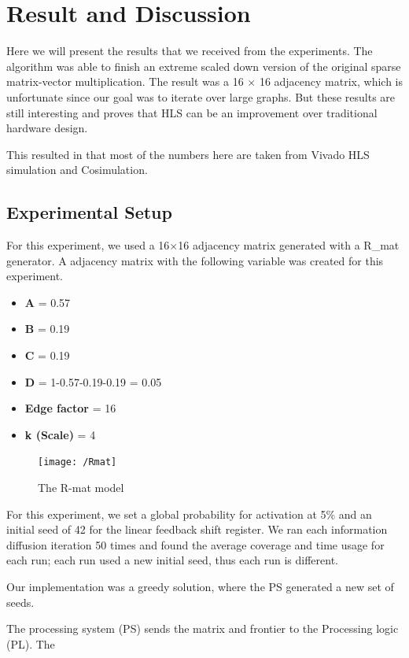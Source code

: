 \chapter{Result and Discussion} \label{result}
Here we will present the results that we received from the experiments. The algorithm was able to finish an extreme scaled down version of the original sparse matrix-vector multiplication. The result was a 16 $\times$ 16 adjacency matrix, which is unfortunate since our goal was to iterate over large graphs. But these results are still interesting and proves that HLS can be an improvement over traditional hardware design.


This resulted in that most of the numbers here are taken from Vivado HLS simulation and Cosimulation. 

\section{Experimental Setup}
For this experiment, we used a 16$\times$16 adjacency matrix generated with a R\_mat generator. A adjacency matrix with the following variable was created for this experiment.
\begin{itemize}
\item \textbf{A} = 0.57
\item \textbf{B} = 0.19
\item \textbf{C} = 0.19
\item \textbf{D} = 1-0.57-0.19-0.19 = 0.05
\item \textbf{Edge factor}  = 16
\item \textbf{k (Scale)} = 4
\end{itemize}

\begin{figure}
\texttt{[image: /Rmat]}
\caption{The R-mat model \cite{Rmat2004}}
\label{fig:Rmat}
\end{figure}

For this experiment, we set a global probability for activation at 5\% and an initial seed of 42 for the linear feedback shift register. We ran each information diffusion iteration 50 times and found the average coverage and time usage for each run; each run used a new initial seed, thus each run is different. 

Our implementation was a greedy solution, where the PS generated a new set of seeds. 

The processing system (PS) sends the matrix and frontier to the Processing logic (PL). The    

